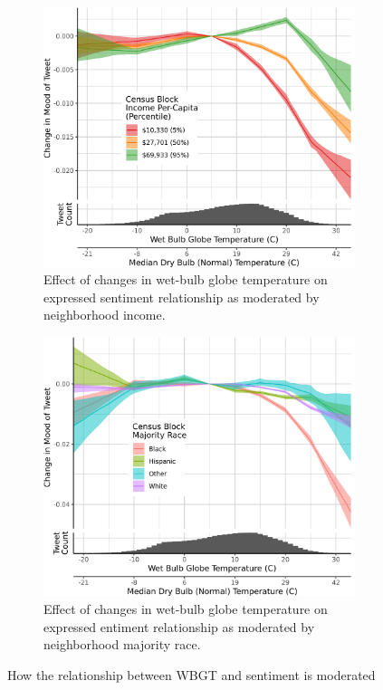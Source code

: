 \documentclass{article}
\begin{document}
\begin{figure}[H]
\centering
\begin{subfigure}{.5\textwidth}
  \centering
  \includegraphics[width=\linewidth]{../res/wbgt-income.png}
  \caption{Effect of changes in wet-bulb globe temperature on expressed sentiment relationship as moderated by neighborhood income.}
  \label{fig:sub1}
\end{subfigure}%
\begin{subfigure}{.5\textwidth}
  \centering
  \includegraphics[width=\linewidth]{../res/wbgt-race_q.png}
  \caption{Effect of changes in wet-bulb globe temperature on expressed entiment relationship as moderated by neighborhood majority race.}
  \label{fig:sub2}
\end{subfigure}
\caption{How the relationship between WBGT and sentiment is moderated }
\label{fig:test}
\end{figure}
\end{document}
